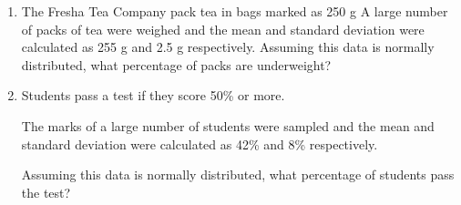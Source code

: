 


\begin{enumerate}
	\item The Fresha Tea Company pack tea in bags marked as 250 g
	A large number of packs of tea were weighed and the mean and standard deviation were calculated as 255 g and 2.5 g respectively.
	Assuming this data is normally distributed, what percentage of packs are underweight?
	
	\item Students pass a test if they score 50\% or more.
	
	The marks of a large number of students were sampled and the mean and standard deviation were calculated as 42\% and 8\% respectively.
	
	Assuming this data is normally distributed, what percentage of students pass the test?
	
\end{enumerate}